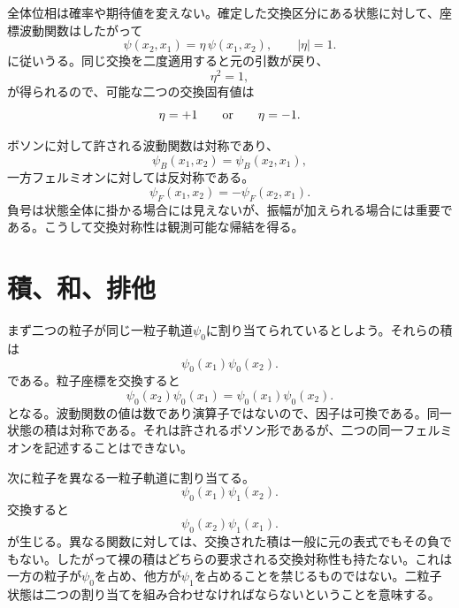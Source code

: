 全体位相は確率や期待値を変えない。確定した交換区分にある状態に対して、座標波動関数はしたがって
\begin{equation}
\psi(x_2,x_1)=\eta\,\psi(x_1,x_2),
\qquad
\lvert\eta\rvert=1.
\end{equation}
に従いうる。同じ交換を二度適用すると元の引数が戻り、
\begin{equation}
\eta^2=1,
\end{equation}
が得られるので、可能な二つの交換固有値は
\begin{equation}
\eta=+1
\qquad\hbox{or}\qquad
\eta=-1.
\end{equation}


ボソンに対して許される波動関数は対称であり、
\begin{equation}
\psi_B(x_1,x_2)=\psi_B(x_2,x_1),
\end{equation}
一方フェルミオンに対しては反対称である。
\begin{equation}
\psi_F(x_1,x_2)=-\psi_F(x_2,x_1).
\end{equation}
負号は状態全体に掛かる場合には見えないが、振幅が加えられる場合には重要である。こうして交換対称性は観測可能な帰結を得る。

\section{積、和、排他}

まず二つの粒子が同じ一粒子軌道\(\psi_0\)に割り当てられているとしよう。それらの積は
\begin{equation}
\psi_0(x_1)\psi_0(x_2).
\end{equation}
である。粒子座標を交換すると
\begin{equation}
\psi_0(x_2)\psi_0(x_1)
=
\psi_0(x_1)\psi_0(x_2).
\end{equation}
となる。波動関数の値は数であり演算子ではないので、因子は可換である。同一状態の積は対称である。それは許されるボソン形であるが、二つの同一フェルミオンを記述することはできない。

次に粒子を異なる一粒子軌道に割り当てる。
\begin{equation}
\psi_0(x_1)\psi_1(x_2).
\end{equation}
交換すると
\begin{equation}
\psi_0(x_2)\psi_1(x_1).
\end{equation}
が生じる。異なる関数に対しては、交換された積は一般に元の表式でもその負でもない。したがって裸の積はどちらの要求される交換対称性も持たない。これは一方の粒子が\(\psi_0\)を占め、他方が\(\psi_1\)を占めることを禁じるものではない。二粒子状態は二つの割り当てを組み合わせなければならないということを意味する。

